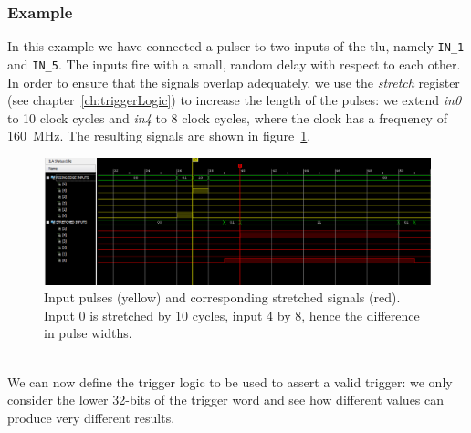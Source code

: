 \subsubsection{Example}
In this example we have connected a pulser to two inputs of the \gls{tlu}, namely \verb|IN_1| and \verb|IN_5|. The inputs fire with a small, random delay with respect to each other.\\
In order to ensure that the signals overlap adequately, we use the \emph{stretch} register (see chapter~\ref{ch:triggerLogic}) to increase the length of the pulses: we extend \emph{in0} to 10 clock cycles and \emph{in4} to 8 clock cycles, where the clock has a frequency of 160~MHz. The resulting signals are shown in figure~\ref{Fig:exampleExtendedTriggers}.
\begin{figure}
  \centering
  \includegraphics[width=.90\textwidth]{./Images/Initial.png}
  \caption{Input pulses (yellow) and corresponding stretched signals (red). Input 0 is stretched by 10 cycles, input 4 by 8, hence the difference in pulse widths.}
  \label{Fig:exampleExtendedTriggers}
\end{figure}\\
We can now define the trigger logic to be used to assert a valid trigger: we only consider the lower 32-bits of the trigger word and see how different values can produce very different results.
